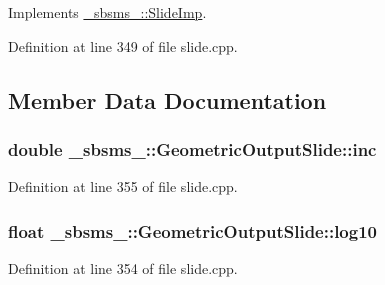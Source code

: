 Implements \hyperlink{class__sbsms___1_1_slide_imp_a9fb8905fd5b0d7c191d1b05717fdd659}{\+\_\+sbsms\+\_\+\+::\+Slide\+Imp}.



Definition at line 349 of file slide.\+cpp.



\subsection{Member Data Documentation}
\subsubsection[{\texorpdfstring{inc}{inc}}]{\setlength{\rightskip}{0pt plus 5cm}double \+\_\+sbsms\+\_\+\+::\+Geometric\+Output\+Slide\+::inc\hspace{0.3cm}{\ttfamily [protected]}}\hypertarget{class__sbsms___1_1_geometric_output_slide_a3d98bbff906aebf5a812aa8bfd133be5}{}\label{class__sbsms___1_1_geometric_output_slide_a3d98bbff906aebf5a812aa8bfd133be5}


Definition at line 355 of file slide.\+cpp.

\subsubsection[{\texorpdfstring{log10}{log10}}]{\setlength{\rightskip}{0pt plus 5cm}float \+\_\+sbsms\+\_\+\+::\+Geometric\+Output\+Slide\+::log10\hspace{0.3cm}{\ttfamily [protected]}}\hypertarget{class__sbsms___1_1_geometric_output_slide_a6a4c6b331e85da69a2fadc47e85ec53b}{}\label{class__sbsms___1_1_geometric_output_slide_a6a4c6b331e85da69a2fadc47e85ec53b}


Definition at line 354 of file slide.\+cpp.

